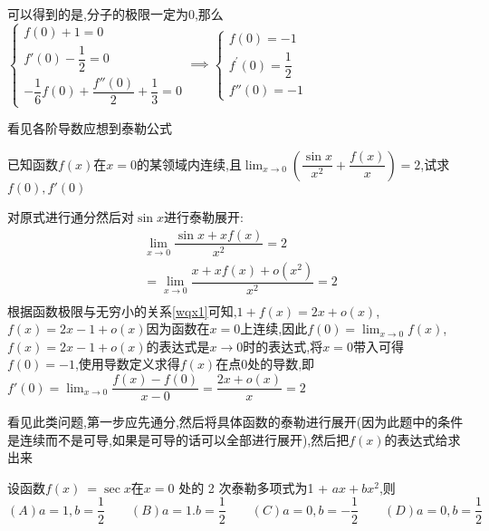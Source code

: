 \documentclass[9pt a4paper, oneside, UTF8]{ctexbook}
\begin{document}
\begin{sloppypar}
\begin{solution}
\begin{equation*}
    \end{equation*}    
    可以得到的是,分子的极限一定为0,那么$\begin{cases}f(0)+1=0\\f'(0)-\dfrac{1}{2}=0\\-\dfrac{1}{6}f(0)+\dfrac{f''(0)}{2}+\dfrac{1}{3}=0\end{cases}\implies \begin{cases}f(0)=-1\\f^{\prime}(0)=\dfrac{1}{2}\\f''(0)=-1\end{cases}$
    \end{solution}
    \begin{note}
        看见各阶导数应想到泰勒公式
    \end{note}
    \begin{problem}
        已知函数$f(x)$在$x=0$的某领域内连续,且$\lim_{x \to 0}(\dfrac{\sin x}{x^2}+\dfrac{f(x)}{x})=2$,试求$f(0),f'(0)$
    \end{problem}
    \begin{solution}
        对原式进行通分然后对$\sin x$进行泰勒展开:
        \begin{equation*}
            \begin{split}    
                & \lim_{x \to 0}\dfrac{\sin x+xf(x)}{x^2}=2\\
                & = \lim_{x \to 0}\dfrac{x+xf(x)+o(x^2)}{x^2}=2 \\
            \end{split}
        \end{equation*} 
    根据函数极限与无穷小的关系\ref{wqx1}可知,$1+f(x)=2x+o(x)$,$f(x)=2x-1+o(x)$因为函数在$x=0$上连续,因此$f(0)=\lim_{x\to 0}f(x)$,$f(x)=2x-1+o(x)$的表达式是$x\to 0$时的表达式,将$x=0$带入可得$f(0)=-1$,使用导数定义求得$f(x)$在点0处的导数,即$f'(0)=\lim_{x \to 0}\dfrac{f(x)-f(0)}{x-0}=\dfrac{2x+o(x)}{x}=2$
    \end{solution}
    \begin{note}
        看见此类问题,第一步应先通分,然后将具体函数的泰勒进行展开(因为此题中的条件是连续而不是可导,如果是可导的话可以全部进行展开),然后把$f(x)$的表达式给求出来
    \end{note}
    \begin{problem}
        设函数$f(x)\:=\sec x$在$x=0$ 处的 2 次泰勒多项式为1 + $ax+bx^2$,则\\
        $(A)a=1,b=\dfrac{1}{2}  \qquad (B)a=1.b=\dfrac{1}{2}  \qquad (C)a=0,b=-\dfrac{1}{2} \qquad  (D)a=0,b=\dfrac{1}{2}$
    \end{problem}

\end{sloppypar}
\end{document}
